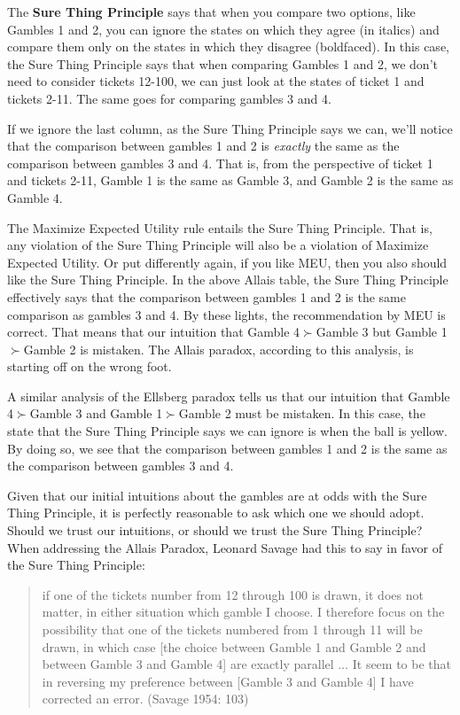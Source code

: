 \documentclass[]{tufte-book}
\begin{document}
The \textbf{Sure Thing Principle} says that when you compare two options, like Gambles 1 and 2, you can ignore the states on which they agree (in italics) and compare them only on the states in which they disagree (boldfaced). In this case, the Sure Thing Principle says that when comparing Gambles 1 and 2, we don't need to consider tickets 12-100, we can just look at the states of ticket 1 and tickets 2-11. The same goes for comparing gambles 3 and 4.

If we ignore the last column, as the Sure Thing Principle says we can, we'll notice that the comparison between gambles 1 and 2 is \emph{exactly} the same as the comparison between gambles 3 and 4. That is, from the perspective of ticket 1 and tickets 2-11, Gamble 1 is the same as Gamble 3, and Gamble 2 is the same as Gamble 4.

The Maximize Expected Utility rule entails the Sure Thing Principle. That is, any violation of the Sure Thing Principle will also be a violation of Maximize Expected Utility. Or put differently again, if you like MEU, then you also should like the Sure Thing Principle. In the above Allais table, the Sure Thing Principle effectively says that the comparison between gambles 1 and 2 is the same comparison as gambles 3 and 4. By these lights, the recommendation by MEU is correct. That means that our intuition that Gamble 4\(\succ\)Gamble 3 but Gamble 1\(\succ\)Gamble 2 is mistaken. The Allais paradox, according to this analysis, is starting off on the wrong foot.

A similar analysis of the Ellsberg paradox tells us that our intuition that Gamble 4\(\succ\)Gamble 3 and Gamble 1\(\succ\)Gamble 2 must be mistaken. In this case, the state that the Sure Thing Principle says we can ignore is when the ball is yellow. By doing so, we see that the comparison between gambles 1 and 2 is the same as the comparison between gambles 3 and 4.

Given that our initial intuitions about the gambles are at odds with the Sure Thing Principle, it is perfectly reasonable to ask which one we should adopt. Should we trust our intuitions, or should we trust the Sure Thing Principle? When addressing the Allais Paradox, Leonard Savage had this to say in favor of the Sure Thing Principle:

\begin{quote}
if one of the tickets number from 12 through 100 is drawn, it does not matter, in either situation which gamble I choose. I therefore focus on the possibility that one of the tickets numbered from 1 through 11 will be drawn, in which case {[}the choice between Gamble 1 and Gamble 2 and between Gamble 3 and Gamble 4{]} are exactly parallel \(\ldots\) It seem to be that in reversing my preference between {[}Gamble 3 and Gamble 4{]} I have corrected an error. (Savage 1954: 103)
\end{quote}
\end{document}
